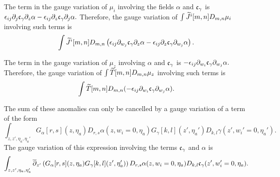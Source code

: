 \documentclass[../main.tex]{subfiles}
\begin{document}
The term in the gauge variation of $\mu_i$ involving the fields $\alpha$ and $\mathfrak{c}_\gamma$ is $\epsilon_{ij} \partial_j \mathfrak{c}_\gamma \partial_z \alpha - \epsilon_{ij} \partial_z \mathfrak{c}_\gamma \partial_j \alpha.$
Therefore, the gauge variation of $\int \widetilde{J}^i [m,n] D_{m,n} \mu_i$ involving such terms is
\[
\int \widetilde{J}^i [m,n] D_{m,n} \left( \epsilon_{ij} \partial_{w_j} \mathfrak{c}_\gamma \partial_z \alpha - \epsilon_{ij} \partial_z \mathfrak{c}_\gamma \partial_{w_j} \alpha \right) .
\]

The term in the gauge variation of $\mu_z$ involving $\alpha$ and $\mathfrak{c}_\gamma$ is $-\epsilon_{ij} \partial_{w_i} \mathfrak{c}_\gamma \partial_{w_j} \alpha.$
Therefore, the gauge variation of $\int \widetilde{T}[m,n] D_{m,n} \mu_z$ involving such terms is
\[
\int \widetilde{T}[m,n] D_{m,n} (- \epsilon_{ij} \partial_{w_i} \mathfrak{c}_\gamma \partial_{w_j} \alpha) .
\]

The sum of these anomalies can only be cancelled by a gauge variation of a term of the form
\[
\int_{z,z',\eta_a,\eta_a'} G_\alpha[r,s] (z,\eta_a) D_{r,s} \alpha(z,w_i=0,\eta_a) G_\gamma[k,l] (z',\eta_a') D_{k,l} \gamma (z',w_i'=0,\eta_a') .
\]
The gauge variation of this expression involving the terms $\mathfrak{c}_\gamma$ and $\alpha$ is
\[
\int_{z,z',\eta_a,\eta_a'} \overline{\partial}_{z'} \left(G_\alpha[r,s] (z,\eta_a) G_\gamma[k,l] (z',\eta_a')\right) D_{r,s} \alpha(z,w_i=0,\eta_a) D_{k,l} \mathfrak{c}_\gamma (z',w_i'=0,\eta_a) .
\]
\end{document}

